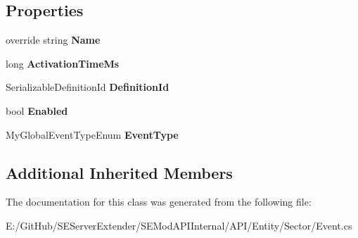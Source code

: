 \subsection*{Properties}
\begin{DoxyCompactItemize}
\item 
\hypertarget{class_s_e_mod_a_p_i_internal_1_1_a_p_i_1_1_entity_1_1_sector_1_1_event_ac7f4b74eadb8cae9d07c33fd48381253}{}override string {\bfseries Name}\label{class_s_e_mod_a_p_i_internal_1_1_a_p_i_1_1_entity_1_1_sector_1_1_event_ac7f4b74eadb8cae9d07c33fd48381253}

\item 
\hypertarget{class_s_e_mod_a_p_i_internal_1_1_a_p_i_1_1_entity_1_1_sector_1_1_event_a02a0d07f0b054ae4424860cf71b9cb70}{}long {\bfseries Activation\+Time\+Ms}\label{class_s_e_mod_a_p_i_internal_1_1_a_p_i_1_1_entity_1_1_sector_1_1_event_a02a0d07f0b054ae4424860cf71b9cb70}

\item 
\hypertarget{class_s_e_mod_a_p_i_internal_1_1_a_p_i_1_1_entity_1_1_sector_1_1_event_a7bb5ce143c43276af49462a68513f95d}{}Serializable\+Definition\+Id {\bfseries Definition\+Id}\label{class_s_e_mod_a_p_i_internal_1_1_a_p_i_1_1_entity_1_1_sector_1_1_event_a7bb5ce143c43276af49462a68513f95d}

\item 
\hypertarget{class_s_e_mod_a_p_i_internal_1_1_a_p_i_1_1_entity_1_1_sector_1_1_event_a47ed86ea5bce1d449b9f321e4cff70db}{}bool {\bfseries Enabled}\label{class_s_e_mod_a_p_i_internal_1_1_a_p_i_1_1_entity_1_1_sector_1_1_event_a47ed86ea5bce1d449b9f321e4cff70db}

\item 
\hypertarget{class_s_e_mod_a_p_i_internal_1_1_a_p_i_1_1_entity_1_1_sector_1_1_event_abff67450e608c023604bab708067a9da}{}My\+Global\+Event\+Type\+Enum {\bfseries Event\+Type}\label{class_s_e_mod_a_p_i_internal_1_1_a_p_i_1_1_entity_1_1_sector_1_1_event_abff67450e608c023604bab708067a9da}

\end{DoxyCompactItemize}
\subsection*{Additional Inherited Members}


The documentation for this class was generated from the following file\+:\begin{DoxyCompactItemize}
\item 
E\+:/\+Git\+Hub/\+S\+E\+Server\+Extender/\+S\+E\+Mod\+A\+P\+I\+Internal/\+A\+P\+I/\+Entity/\+Sector/Event.\+cs\end{DoxyCompactItemize}
